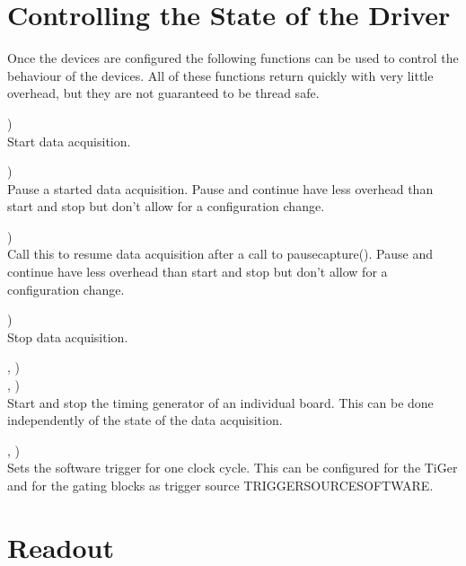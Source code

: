 	\section{Controlling the State of the Driver}
	Once the devices are configured the following functions can be used to control the behaviour of the devices. 
	All of these functions return quickly with very little overhead, but they are not guaranteed to be thread safe.

		\device)\\
		Start data acquisition.\par

		\device)\\
		Pause a started data acquisition. 
		Pause and continue have less overhead than start and stop but don't allow for a configuration change.\par

		\device)\\
		Call this to resume data acquisition after a call to \textsf{\prefix pause\tu capture()}.
		Pause and continue have less overhead than start and stop but don't allow for a configuration change.\par

		\device)\\
		Stop data acquisition.\par

		\device, )\\
		\device, )\\
		Start and stop the timing generator of an individual board. 
		This can be done independently of the state of the data acquisition.\par
		
		\device, )\\
		Sets the software trigger for one clock cycle. 
		This can be configured for the TiGer and for the gating blocks as trigger source \textsf{\PREFIX TRIGGER\tu SOURCE\tu SOFTWARE}. 


\section{Readout}

